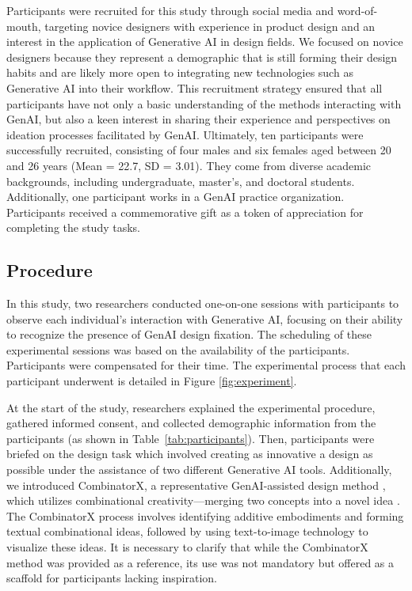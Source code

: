 Participants were recruited for this study through social media and word-of-mouth, targeting novice designers with experience in product design and an interest in the application of Generative AI in design fields. We focused on novice designers because they represent a demographic that is still forming their design habits and are likely more open to integrating new technologies such as Generative AI into their workflow. This recruitment strategy ensured that all participants have not only a basic understanding of the methods interacting with GenAI, but also a keen interest in sharing their experience and perspectives on ideation processes facilitated by GenAI. Ultimately, ten participants were successfully recruited, consisting of four males and six females aged between 20 and 26 years (Mean = 22.7, SD = 3.01). They come from diverse academic backgrounds, including undergraduate, master’s, and doctoral students. Additionally, one participant works in a GenAI practice organization. Participants received a commemorative gift as a token of appreciation for completing the study tasks.

\subsection{Procedure}
\label{experiment_procedure}
In this study, two researchers conducted one-on-one sessions with participants to observe each individual’s interaction with Generative AI, focusing on their ability to recognize the presence of GenAI design fixation. The scheduling of these experimental sessions was based on the availability of the participants. Participants were compensated for their time. The experimental process that each participant underwent is detailed in Figure \ref{fig:experiment}.

At the start of the study, researchers explained the experimental procedure, gathered informed consent, and collected demographic information from the participants (as shown in Table~\ref{tab:participants}). Then, participants were briefed on the design task which involved creating as innovative a design as possible under the assistance of two different Generative AI tools. Additionally, we introduced CombinatorX, a representative GenAI-assisted design method \cite{chen2024foundation}, which utilizes combinational creativity—merging two concepts into a novel idea \cite{boden2004creative}. The CombinatorX process involves identifying additive embodiments and forming textual combinational ideas, followed by using text-to-image technology to visualize these ideas. It is necessary to clarify that while the CombinatorX method was provided as a reference, its use was not mandatory but offered as a scaffold for participants lacking inspiration.

